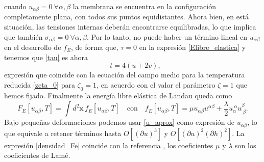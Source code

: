 cuando $u_{\alpha\beta}=0 \ \forall\alpha,\beta$ la membrana se encuentra en
la configuración completamente plana, con todos sus puntos
equidistantes. Ahora bien, en está situación, las tensiones internas deberán
encontrarse equilibradas\cite{Landau_Elasticidad}, lo que implica que también $\sigma_{\alpha\beta}=0 \
\forall\alpha,\beta$. Por lo tanto, no puede haber 
un término lineal en $u_{\alpha\beta}$ en el desarrollo de $f_E$, de forma que,
 $\tau=0$ en la expresión \eqref{Elibre_elastica} y tenemos que \eqref{tau} es ahora
\begin{equation}\label{tau=0}
-t=4(u+2v),
\end{equation}   
expresión que coincide con la ecuación del campo medio para la temperatura reducida
\eqref{zeta_0} para $\zeta_0=1$, en acuerdo con el valor el parámetro $\zeta=1$
que hemos fijado. Finalmente la energía libre elástica de Landau queda como
\begin{equation}
F_E[u_{\alpha\beta},T]=\int d^2\mathbf{x}\, f_E[u_{\alpha\beta},T]\quad \text{con}\quad
f_E[u_{\alpha\beta},T]=
\mu u_{\alpha\beta}u^{\alpha\beta} +
\frac{\lambda}{2}u_{\alpha}^{\ \alpha}u^{\beta}_{\ \beta}\label{densidad_Fe}.
\end{equation} 
Bajo pequeñas deformaciones podemos usar \eqref{u_aprox} 
como expresión de $u_{\alpha\beta}$, lo que equivale a retener términos hasta
$O[(\partial u)^3]$ y $O[(\partial u)^2(\partial h)^2]$. La expresión
\eqref{densidad_Fe} coincide con la referencia \cite{Landau_Elasticidad}, los coeficientes $\mu$ y
$\lambda$ son los coeficientes de Lamé.  

